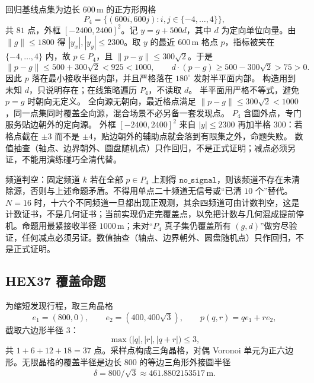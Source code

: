 回归基线点集为边长 $600\,\mathrm{m}$ 的正方形网格
\begin{equation}
P_4=\bigl\{(600i,600j):i,j\in\{-4,\ldots,4\}\bigr\},
\end{equation}
共 $81$ 点，外框 $[-2400,2400]^2$。记 $y=g+500d$，其中 $d$ 为定向单位向量。由 $\|g\|\le 1800$ 得 $|y_x|,|y_y|\le 2300$。取 $y$ 的最近 $600\,\mathrm{m}$ 格点 $p$，指标被夹在 $\{-4,\ldots,4\}$ 内，故 $p\in P_4$，且 $\|p-y\|\le 300\sqrt{2}$。于是
\begin{equation}
\|p-g\|\le 500+300\sqrt{2}<925<1000,\qquad d\cdot(p-g)\ge 500-300\sqrt{2}>75>0.
\end{equation}
因此 $p$ 落在最小接收半径内部，并且严格落在 $180^\circ$ 发射半平面内部。
构造用到未知 $d$，只说明存在；在线策略遍历 $P_4$，不读取 $d$。
半平面用严格不等式，避免 $p=g$ 时朝向无定义。
全向源无朝向，最近格点满足 $\|p-g\|\le 300\sqrt{2}<1000$，同一点集同时覆盖全向源，混合场景不必另备一套发现点。
$P_4$ 含圆外点，专门服务贴边朝外的定向源。
外框 $[-2400,2400]^2$ 来自 $|y|\le 2300$ 再加半格 $300$：若格点截在 $\pm 3$ 而不是 $\pm 4$，贴边朝外的辅助点就会落到有限集之外，命题失败。
数值抽查（轴点、边界朝外、圆盘随机点）只作回归，不是正式证明；减点必须另证，不能用演练碰巧全清代替。

频道判空：固定频道 $k$ 若在全部 $p\in P_4$ 上测得 $\mathtt{no\_signal}$，则该频道不存在未清除源，否则与上述命题矛盾。不得用单点二十频道无信号或“已清 $10$ 个”替代。$N=16$ 时，十六个不同频道一旦都出现正观测，其余四频道可由计数判空，这是计数证书，不是几何证书；当前实现仍走完覆盖点，以免把计数与几何混成提前停机。命题用最紧接收半径 $1000\,\mathrm{m}$；未对“$P_4$ 真子集仍覆盖所有 $(g,d)$”做穷尽验证，任何减点必须另证。数值抽查（轴点、边界朝外、圆盘随机点）只作回归，不是正式证明。

\subsection{HEX37 覆盖命题}

为缩短发现行程，取三角晶格
\begin{equation}
e_1=(800,0),\qquad e_2=(400,400\sqrt{3}),\qquad p(q,r)=qe_1+re_2,
\end{equation}
截取六边形半径 $3$：
\begin{equation}
\max\bigl(|q|,|r|,|q+r|\bigr)\le 3,
\end{equation}
共 $1+6+12+18=37$ 点。采样点构成三角晶格，对偶 Voronoi 单元为正六边形。无限晶格的覆盖半径是边长 $800$ 的等边三角形外接圆半径
\begin{equation}
\delta=800/\sqrt{3}\approx 461.8802153517\,\mathrm{m}.
\end{equation}


